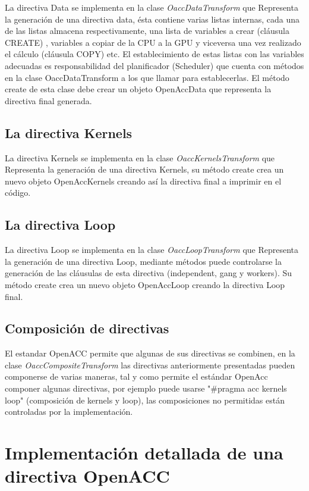 La directiva Data se implementa en la clase \textit{OaccDataTransform} que Representa la generación de una directiva data, ésta contiene varias listas internas, cada una de las listas almacena respectivamente, una lista de variables a crear (cláusula CREATE) , variables a copiar de la CPU a la GPU y viceversa una vez realizado el cálculo (cláusula COPY) etc. El establecimiento de estas listas con las variables adecuadas es responsabilidad del planificador (Scheduler) que cuenta con métodos en la clase OaccDataTransform a los que llamar para establecerlas. El método create de esta clase debe crear un objeto OpenAccData que representa la directiva final generada.

\subsection{La directiva Kernels}
La directiva Kernels se implementa en la clase \textit{OaccKernelsTransform} que Representa la generación de una directiva Kernels, su método create crea un nuevo objeto OpenAccKernels creando así la directiva final a imprimir en el código.

\subsection{La directiva Loop}
La directiva Loop se implementa en la clase \textit{OaccLoopTransform} que Representa la generación de una directiva Loop, mediante métodos puede controlarse la generación de las cláusulas de esta directiva (independent, gang y workers). Su método create crea un nuevo objeto OpenAccLoop creando la directiva Loop final.

\subsection{Composición de directivas}
El estandar OpenACC permite que algunas de sus directivas se combinen, en la clase \textit{OaccCompositeTransform} las directivas anteriormente presentadas pueden componerse de varias maneras, tal y como permite el estándar OpenAcc componer algunas directivas, por ejemplo puede usarse "\#pragma acc kernels loop" (composición de kernels y loop), las composiciones no permitidas están controladas por la implementación.

\section{Implementación detallada de una directiva OpenACC}

